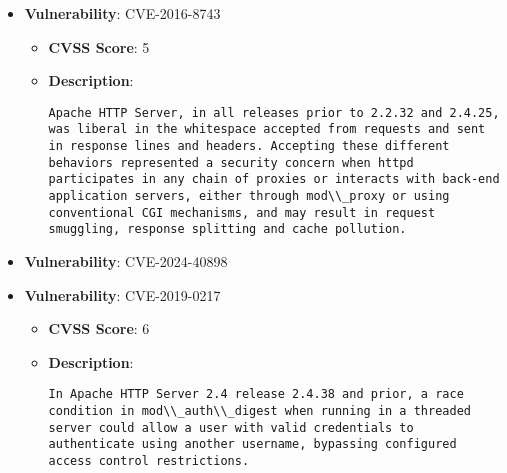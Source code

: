 \documentclass{article}
\begin{document}
\begin{itemize}
        \item \textbf{Vulnerability}: CVE-2016-8743
        \begin{itemize}
            \item \textbf{CVSS Score}:  5 
            \item \textbf{Description}:
            \parbox[t]{0.9\linewidth}{
                \verb|Apache HTTP Server, in all releases prior to 2.2.32 and 2.4.25, was liberal in the whitespace accepted from requests and sent in response lines and headers. Accepting these different behaviors represented a security concern when httpd participates in any chain of proxies or interacts with back-end application servers, either through mod\\_proxy or using conventional CGI mechanisms, and may result in request smuggling, response splitting and cache pollution.|
            }
        \end{itemize}
    
        \item \textbf{Vulnerability}: CVE-2024-40898
    
        \item \textbf{Vulnerability}: CVE-2019-0217
        \begin{itemize}
            \item \textbf{CVSS Score}:  6 
            \item \textbf{Description}:
            \parbox[t]{0.9\linewidth}{
                \verb|In Apache HTTP Server 2.4 release 2.4.38 and prior, a race condition in mod\\_auth\\_digest when running in a threaded server could allow a user with valid credentials to authenticate using another username, bypassing configured access control restrictions.|
            }
        \end{itemize}
    

\end{itemize}
\end{document}
